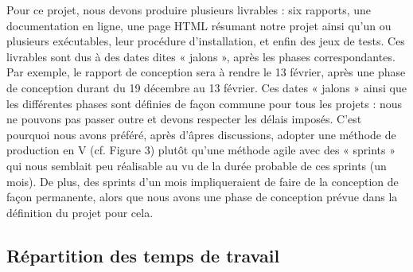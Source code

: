 Pour ce projet, nous devons produire plusieurs livrables : six rapports, une
documentation en ligne, une page HTML résumant notre projet ainsi qu’un ou plusieurs
exécutables, leur procédure d’installation, et enfin des jeux de tests.
Ces livrables sont dus à des dates dites « jalons », après les phases
correspondantes. Par exemple, le rapport de conception sera à rendre le 13 février,
après une phase de conception durant du 19 décembre au 13 février.
Ces dates « jalons » ainsi que les différentes phases sont définies de façon
commune pour tous les projets : nous ne pouvons pas passer outre et devons respecter
les délais imposés. C’est pourquoi nous avons préféré, après d’âpres discussions,
adopter une méthode de production en V (cf. Figure 3) plutôt qu’une méthode agile
avec des « sprints » qui nous semblait peu réalisable au vu de la durée probable de
ces sprints (un mois). De plus, des sprints d’un mois impliqueraient de faire de la
conception de façon permanente, alors que nous avons une phase de conception
prévue dans la définition du projet pour cela.

\subsection{Répartition des temps de travail}


